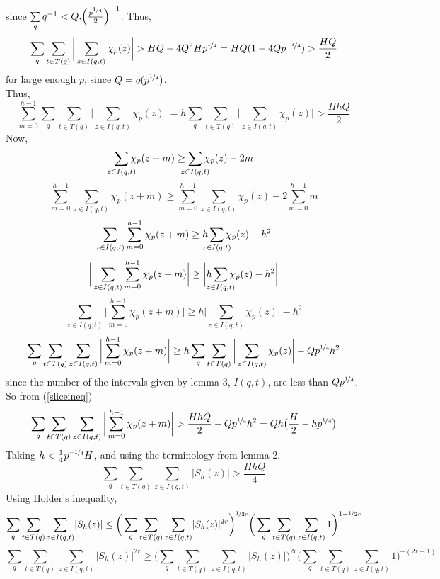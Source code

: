 \documentclass{article}
\begin{document}
since $\sum\limits_q q^{-1} < Q.\Big(\frac{p^{\nicefrac{1}{4}}}{2}\Big)^{-1}$. Thus,
$$\sum_q\sum\limits_{t\in T(q)}\bigg \lvert\sum\limits_{z\in I(q,t)}\chi_p(z)\bigg \rvert > HQ - 4Q^2 Hp^{\nicefrac{1}{4}}=HQ(1-4Qp^{\nicefrac{-1}{4}})>\frac{HQ}{2}$$
for large enough $p$, since $Q=o(p^{\nicefrac{1}{4}})$.\\
Thus,
\begin{equation} \label{sliceineq}
\sum\limits_{m=0}^{h-1}\sum_q\sum\limits_{t\in T(q)}\bigg \lvert\sum\limits_{z\in I(q,t)}\chi_p(z)\bigg \rvert = h \sum_q\sum\limits_{t\in T(q)}\bigg \lvert\sum\limits_{z\in I(q,t)}\chi_p(z)\bigg \rvert > \frac{HhQ}{2}
\end{equation}
Now,
$$\sum\limits_{\mathclap {z\in I(q,t)}}\chi_p(z+m)\geq \sum\limits_{\mathclap{z\in I(q,t)}}\chi_p(z)-2m$$
$$\sum\limits_{m=0}^{h-1}\sum\limits_{z\in I(q,t)}\chi_p(z+m)\geq \sum\limits_{m=0}^{h-1}\sum\limits_{z\in I(q,t)}\chi_p(z)-2 \sum\limits_{m=0}^{h-1}m$$
$$\sum\limits_{z\in I(q,t)}\sum\limits_{m=0}^{h-1}\chi_p(z+m)\geq h\sum\limits_{\mathclap{z\in I(q,t)}}\chi_p(z)-h^2$$
$$\bigg \lvert\sum\limits_{z\in I(q,t)} \sum\limits_{m=0}^{h-1}\chi_p(z+m) \bigg \rvert \geq \bigg \lvert h\sum\limits_{\mathclap{z\in I(q,t)}}\chi_p(z)-h^2 \bigg \rvert$$
$$\sum\limits_{z\in I(q,t)}\bigg \lvert \sum\limits_{m=0}^{h-1}\chi_p(z+m) \bigg \rvert \geq h\bigg \lvert \sum\limits_{z\in I(q,t)}\chi_p(z)\bigg \rvert-h^2 $$
$$\sum_q\sum\limits_{t\in T(q)}\sum\limits_{z\in I(q,t)}\bigg \lvert \sum\limits_{m=0}^{h-1}\chi_p(z+m) \bigg \rvert \geq h\sum_q\sum\limits_{t\in T(q)}\bigg \lvert \sum\limits_{z\in I(q,t)}\chi_p(z)\bigg \rvert-Qp^{\nicefrac{1}{4}}h^2$$
since the number of the intervals given by lemma 3, $I(q,t)$, are less than $Qp^{\nicefrac{1}{4}}$. So from (\ref{sliceineq})
$$\sum_q\sum\limits_{t\in T(q)}\sum\limits_{z\in I(q,t)}\bigg \lvert \sum\limits_{m=0}^{h-1}\chi_p(z+m) \bigg \rvert > \frac{HhQ}{2}-Qp^{\nicefrac{1}{4}} h^2=Qh\big(\frac{H}{2}-hp^{\nicefrac{1}{4}}\big)$$
Taking $h<\frac{1}{4}p^{\nicefrac{-1}{4}}H$, and using the terminology from lemma 2,
$$\sum_q\sum\limits_{t\in T(q)}\sum\limits_{z\in I(q,t)}\lvert S_h(z) \rvert > \frac{HhQ}{4}$$
Using Holder's inequality,
$$\sum_q\sum\limits_{t\in T(q)}\sum\limits_{z\in I(q,t)}\lvert S_h(z) \rvert \leq \bigg ( \sum_q\sum\limits_{t\in T(q)}\sum\limits_{z\in I(q,t)}\lvert S_h(z) \rvert^{2r} \bigg )^{\nicefrac{1}{2r}}\bigg ( \sum_q\sum\limits_{t\in T(q)}\sum\limits_{z\in I(q,t)}1 \bigg )^{1-\nicefrac{1}{2r}}$$
$$\sum_q\sum\limits_{t\in T(q)}\sum\limits_{z\in I(q,t)}\lvert S_h(z) \rvert^{2r} \geq \bigg ( \sum_q\sum\limits_{t\in T(q)}\sum\limits_{z\in I(q,t)}\lvert S_h(z) \rvert \bigg )^{2r} \bigg ( \sum_q\sum\limits_{t\in T(q)}\sum\limits_{z\in I(q,t)}1 \bigg )^{-(2r-1)}$$
\end{document}
